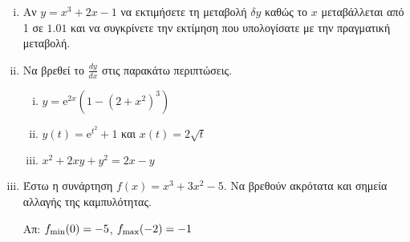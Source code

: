 \documentclass[a4paper]{report}
\begin{document}
\vspace{\baselineskip}


\begin{exercise}
  \item 
    \begin{enumerate}[i)]
      \item Αν $ y= x^{3}+2x-1 $ να εκτιμήσετε τη μεταβολή $ \delta y $ καθώς το $x$ 
        μεταβάλλεται από 1 σε $ 1.01 $ και να συγκρίνετε την εκτίμηση που υπολογίσατε 
        με την πραγματική μεταβολή.
      \item Να βρεθεί το $ \frac{dy}{dx} $ στις παρακάτω περιπτώσεις. 
        \begin{enumerate}[i)]
          \item $ y = \mathrm{e}^{2x} (1 - (2+x^2)^3 ) $
          \item $ y(t) = \mathrm{e}^{t^2} + 1 $ και $ x(t) = 2 \sqrt{t} $
          \item $ x^{2} + 2xy+ y^2 = 2x - y $
        \end{enumerate}
      \item Έστω η συνάρτηση $ f(x) = x^{3}+3x^{2}-5 $. Να βρεθούν ακρότατα και σημεία 
        αλλαγής της καμπυλότητας.

        \hfill Απ: $ f_{\rm min}(0) = -5 $, $ f_{\rm max}(-2) = -1 $ 
    \end{enumerate}
\end{exercise}
\end{document}
